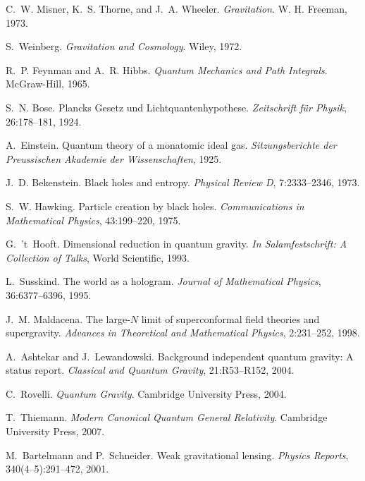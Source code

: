 \documentclass[11pt]{article}
\begin{document}
\begin{thebibliography}{99}
C.~W. Misner, K.~S. Thorne, and J.~A. Wheeler.
\emph{Gravitation}.
W. H. Freeman, 1973.

S.~Weinberg.
\emph{Gravitation and Cosmology}.
Wiley, 1972.

R.~P. Feynman and A.~R. Hibbs.
\emph{Quantum Mechanics and Path Integrals}.
McGraw-Hill, 1965.

S.~N. Bose.
Plancks Gesetz und Lichtquantenhypothese.
\emph{Zeitschrift für Physik}, 26:178--181, 1924.

A.~Einstein.
Quantum theory of a monatomic ideal gas.
\emph{Sitzungsberichte der Preussischen Akademie der Wissenschaften}, 1925.

J.~D. Bekenstein.
Black holes and entropy.
\emph{Physical Review D}, 7:2333--2346, 1973.

S.~W. Hawking.
Particle creation by black holes.
\emph{Communications in Mathematical Physics}, 43:199--220, 1975.

G.~'t~Hooft.
Dimensional reduction in quantum gravity.
\emph{In Salamfestschrift: A Collection of Talks}, World Scientific, 1993.

L.~Susskind.
The world as a hologram.
\emph{Journal of Mathematical Physics}, 36:6377--6396, 1995.

J.~M. Maldacena.
The large-$N$ limit of superconformal field theories and supergravity.
\emph{Advances in Theoretical and Mathematical Physics}, 2:231--252, 1998.

A.~Ashtekar and J.~Lewandowski.
Background independent quantum gravity: A status report.
\emph{Classical and Quantum Gravity}, 21:R53--R152, 2004.

C.~Rovelli.
\emph{Quantum Gravity}.
Cambridge University Press, 2004.

T.~Thiemann.
\emph{Modern Canonical Quantum General Relativity}.
Cambridge University Press, 2007.

M.~Bartelmann and P.~Schneider.
Weak gravitational lensing.
\emph{Physics Reports}, 340(4--5):291--472, 2001.


\end{thebibliography}
\end{document}
